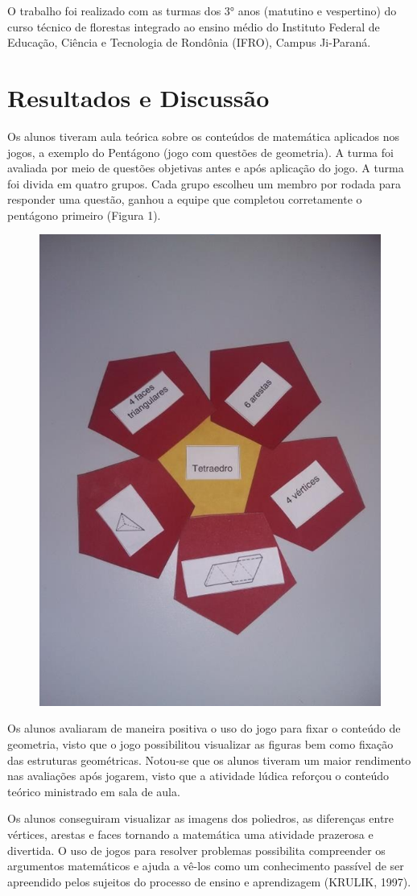\documentclass[article,12pt,onesidea,4paper,english,brazil]{abntex2}
\begin{document}
O trabalho foi realizado com as turmas dos 3° anos (matutino e vespertino) do curso técnico de florestas integrado ao ensino médio do Instituto Federal de Educação, Ciência e Tecnologia de Rondônia (IFRO), Campus Ji-Paraná.
	
	\section*{Resultados e Discussão}
	
Os alunos tiveram aula teórica sobre os conteúdos de matemática aplicados nos jogos, a exemplo do Pentágono (jogo com questões de geometria). A turma foi avaliada por meio de questões objetivas antes e após aplicação do jogo. A turma foi divida em quatro grupos. Cada grupo escolheu um membro por rodada para responder uma questão, ganhou a equipe que completou corretamente o pentágono primeiro (Figura 1).

\begin{figure}[h]
	\centering
	\includegraphics[width=0.35\linewidth]{pip09.png}
\end{figure}

Os alunos avaliaram de maneira positiva o uso do jogo para fixar o conteúdo de geometria, visto que o jogo possibilitou visualizar as figuras bem como fixação das estruturas geométricas. Notou-se que os alunos tiveram um maior rendimento nas avaliações após jogarem, visto que a atividade lúdica reforçou o conteúdo teórico ministrado em sala de aula.

Os alunos conseguiram visualizar as imagens dos poliedros, as diferenças entre vértices, arestas e faces tornando a matemática uma atividade prazerosa e divertida. O uso de jogos para resolver problemas possibilita compreender os argumentos matemáticos e ajuda a vê-los como um conhecimento passível de ser apreendido pelos sujeitos do processo de ensino e aprendizagem (KRULIK, 1997).
\end{document}
